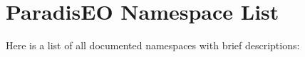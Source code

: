 \section{Paradis\-EO Namespace List}
Here is a list of all documented namespaces with brief descriptions:\begin{CompactList}
\item{}
\end{CompactList}
